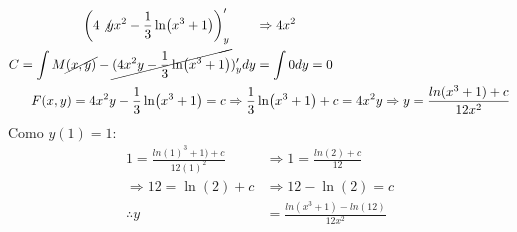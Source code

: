 \begin{itemize}
\begin{align*}
       \left(4\not yx^2-\frac{1}{3}\ln(x^3+1)\right)_y' \qquad &\Rightarrow 4x^2\\
       C=\int M\cancel{(x,y)} - \cancel{(4x^2y -\frac{1}{3}\ln(x^3+1)})_y'dy &=\int 0dy=0\\
       F(x,y) = 4x^2y-\frac{1}{3}\ln(x^3+1)=c \Rightarrow\frac{1}{3} &\ln(x^3+1)+c=4x^2y \Rightarrow y=\frac{ln(x^3+1)+c}{12x^2}
   \end{align*}
   Como $y(1)=1$:
   \begin{align*}
       1=\frac{ln(1)^3+1)+c}{12(1)^2} &\Rightarrow 1=\frac{ln(2)+c}{12}\\
       \Rightarrow 12=\ln(2)+c &\Rightarrow 12-\ln(2)=c\\
       \therefore y &= \frac{ln(x^3+1)-ln(12)}{12x^2}
   \end{align*}
   
\end{itemize}



